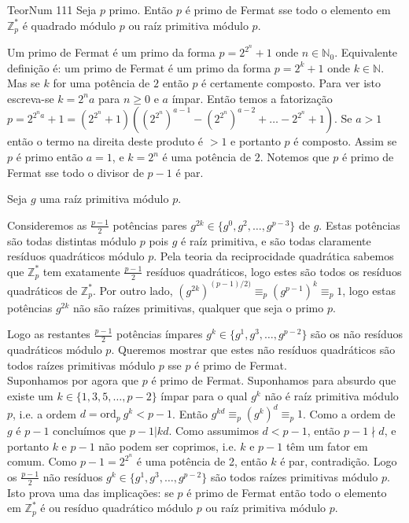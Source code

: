 \documentclass[repertorio-solutions-1.tex]{subfiles}
\renewcommand*{\ord}[1]{\ensuremath{\text{ord}_#1\:}}
\begin{document}
\begin{problem}{TeorNum 111}
Seja $p$ primo. Então $p$ é primo de Fermat sse todo o elemento
em $\mathbb{Z}_p^*$ é quadrado módulo $p$ ou raíz primitiva módulo $p$.
\end{problem}

\begin{solution}
\begin{smallnote}
Um primo de Fermat é um primo da forma $p=2^{2^n}+1$ onde $n\in\mathbb{N}_0$.
Equivalente definição é: um primo de Fermat é um primo da forma $p=2^k+1$ onde $k\in\mathbb{N}$.
Mas se $k$ for uma potência de $2$ então $p$ é certamente composto. Para ver isto escreva-se $k=2^na$ para $n\geq 0$ e $a$ ímpar.
Então temos a fatorização
$p=2^{2^na}+1=(2^{2^n}+1)((2^{2^n})^{a-1}-(2^{2^n})^{a-2}+\dots-2^{2^n}+1)$.
Se $a>1$ então o termo na direita deste produto é $>1$ e portanto $p$ é composto.
Assim se $p$ é primo então $a=1$, e $k=2^n$ é uma potência de $2$. Notemos que $p$ é primo de Fermat sse todo o divisor de $p-1$ é par.
\end{smallnote}

Seja $g$ uma raíz primitiva módulo $p$.

Consideremos as $\frac{p-1}{2}$ potências pares
$g^{2k}\in\{g^0,g^2,\dots,g^{p-3}\}$ de $g$.
Estas potências são todas distintas módulo $p$ pois $g$ é raíz primitiva,
e são todas claramente resíduos quadráticos módulo $p$.
Pela teoria da reciprocidade quadrática sabemos que $\mathbb{Z}_p^*$ tem
exatamente $\frac{p-1}{2}$ resíduos quadráticos, logo estes são todos os
resíduos quadráticos de $\mathbb{Z}_p^*$. Por outro lado,
$(g^{2k})^{(p-1)/2)}\equiv_p (g^{p-1})^k\equiv_p 1$, logo estas potências
$g^{2k}$ não são raízes primitivas, qualquer que seja o primo $p$.

Logo as restantes $\frac{p-1}{2}$ potências ímpares
$g^k\in\{g^1,g^3,\dots,g^{p-2}\}$ são os não resíduos quadráticos módulo $p$.
Queremos mostrar que estes não resíduos quadráticos são todos raízes
primitivas módulo $p$ sse $p$ é primo de Fermat.
\\

Suponhamos por agora que $p$ é primo de Fermat.
Suponhamos para absurdo que existe um $k\in\{1,3,5,\dots,p-2\}$ ímpar para o
qual $g^k$ não é raíz primitiva módulo $p$, i.e. a ordem $d=\ord{p}g^k<p-1$.
Então $g^{kd}\equiv_p(g^k)^d\equiv_p 1$.
Como a ordem de $g$ é $p-1$ concluímos que $p-1|kd$.
Como assumimos $d<p-1$, então $p-1\nmid d$, e portanto $k$ e $p-1$ não
podem ser coprimos, i.e. $k$ e $p-1$ têm um fator em comum.
Como $p-1=2^{2^n}$ é uma potência de 2, então $k$ é par, contradição.
Logo os $\frac{p-1}{2}$ não resíduos $g^k\in\{g^1,g^3,\dots,g^{p-2}\}$
são todos raízes primitivas módulo $p$.
Isto prova uma das implicações: se $p$ é primo de Fermat então todo o
elemento em $\mathbb{Z}_p^*$ é ou resíduo quadrático módulo $p$ ou raíz
primitiva módulo $p$.
\\


\end{solution}
\end{document}
